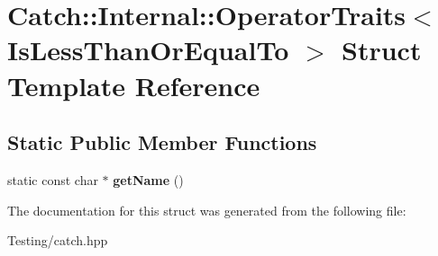 \hypertarget{struct_catch_1_1_internal_1_1_operator_traits_3_01_is_less_than_or_equal_to_01_4}{\section{Catch\-:\-:Internal\-:\-:Operator\-Traits$<$ Is\-Less\-Than\-Or\-Equal\-To $>$ Struct Template Reference}
\label{struct_catch_1_1_internal_1_1_operator_traits_3_01_is_less_than_or_equal_to_01_4}
}
\subsection*{Static Public Member Functions}
\begin{DoxyCompactItemize}
\item 
\hypertarget{struct_catch_1_1_internal_1_1_operator_traits_3_01_is_less_than_or_equal_to_01_4_ae8578813bc847838f10448c1541a9d7b}{static const char $\ast$ {\bfseries get\-Name} ()}\label{struct_catch_1_1_internal_1_1_operator_traits_3_01_is_less_than_or_equal_to_01_4_ae8578813bc847838f10448c1541a9d7b}

\end{DoxyCompactItemize}


The documentation for this struct was generated from the following file\-:\begin{DoxyCompactItemize}
\item 
Testing/catch.\-hpp\end{DoxyCompactItemize}
